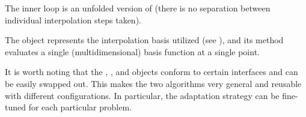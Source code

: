 \begin{compactlist}

 The inner loop is an unfolded version of 
(there is no separation between individual interpolation steps taken).


 The  object represents the interpolation basis
utilized (see ), and its  method evaluates a single
(multidimensional) basis function at a single point.

\end{compactlist}

It is worth noting that the , , and 
objects conform to certain interfaces and can be easily swapped out. This makes
the two algorithms very general and reusable with different configurations. In
particular, the adaptation strategy can be fine-tuned for each particular
problem.
